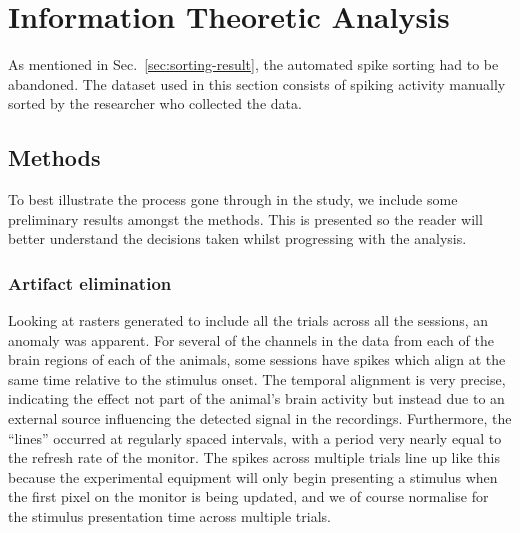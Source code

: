 \chapter{Information Theoretic Analysis}

As mentioned in Sec.~\ref{sec:sorting-result}, the automated spike sorting had to be abandoned. The dataset used in this section consists of spiking activity manually sorted by the researcher who collected the data.

\section{Methods}

To best illustrate the process gone through in the study, we include some preliminary results amongst the methods.
This is presented so the reader will better understand the decisions taken whilst progressing with the analysis.

\FloatBarrier
\subsection{Artifact elimination}
\label{sec:ma}

Looking at rasters generated to include all the trials across all the sessions, an anomaly was apparent.
For several of the channels in the data from each of the brain regions of each of the animals, some sessions have spikes which align at the same time relative to the stimulus onset. The temporal alignment is very precise, indicating the effect not part of the animal's brain activity but instead due to an external source influencing the detected signal in the recordings. Furthermore, the ``lines'' occurred at regularly spaced intervals, with a period very nearly equal to the refresh rate of the monitor. The spikes across multiple trials line up like this because the experimental equipment will only begin presenting a stimulus when the first pixel on the monitor is being updated, and we of course normalise for the stimulus presentation time across multiple trials.

